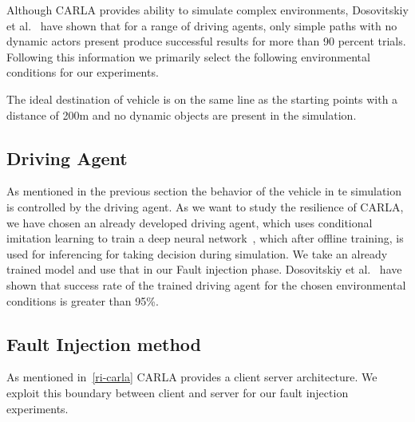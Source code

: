 Although CARLA provides ability to simulate complex environments, Dosovitskiy et al.~\cite{Dosovitskiy17} have shown that for a range of driving agents, only simple paths with no dynamic actors present produce successful results for more than 90 percent trials. Following this information we primarily select the following environmental conditions for our experiments. 

The ideal destination of vehicle is on the same line as the starting points with a distance of 200m and no dynamic objects are present in the simulation.

\subsection{Driving Agent}
As mentioned in the previous section the behavior of the vehicle in te simulation is controlled by the driving agent. As we want to study the resilience of CARLA, we have chosen an already developed driving agent, which uses conditional imitation learning to train a deep neural network~\cite{Codevilla2018}, which after offline training, is used for inferencing for taking decision during simulation. We take an already trained model and use that in our Fault injection phase. Dosovitskiy et al.~\cite{Dosovitskiy17} have shown that success rate of the trained driving agent for the chosen environmental conditions is greater than 95\%.

\subsection{Fault Injection method} \label{method}
As mentioned in~\ref{ri-carla} CARLA provides a client server architecture. We exploit this boundary between client and server for our fault injection experiments. 

